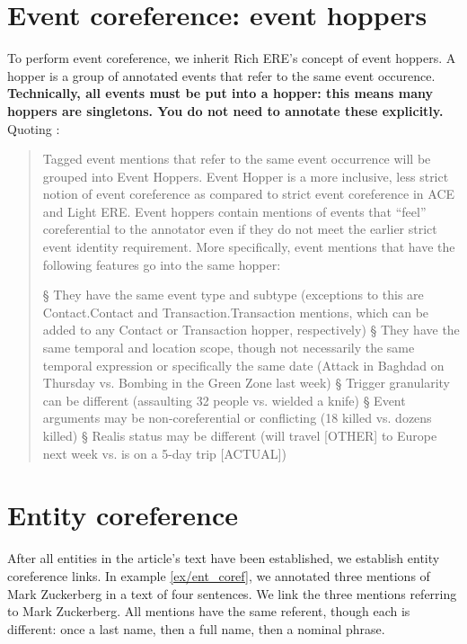 \section{Event coreference: event hoppers}

To perform event coreference, we inherit Rich ERE's concept of event hoppers. \cite{LDC2016.rich_ere} A hopper is a group of annotated events that refer to the same event occurence. \textbf{Technically, all events must be put into a hopper: this means many hoppers are singletons. You do not need to annotate these explicitly.} Quoting \cite{LDC2016.rich_ere}:

\begin{quote}
    Tagged event mentions that refer to the same event occurrence will be grouped into Event Hoppers. Event Hopper is a more inclusive, less strict notion of event coreference as compared to strict event coreference in ACE and Light ERE. Event hoppers contain mentions of events that “feel” coreferential to the annotator even if they do not meet the earlier strict event identity requirement. More specifically, event mentions that have the following features go into the same hopper:

    \begin{el}
        § They have the same event type and subtype (exceptions to this are Contact.Contact and Transaction.Transaction mentions, which can be added to any Contact or Transaction hopper, respectively)
        § They have the same temporal and location scope, though not necessarily the same temporal expression or specifically the same date (Attack in Baghdad on Thursday vs. Bombing in the Green Zone last week)
        § Trigger granularity can be different (assaulting 32 people vs. wielded a knife)
        § Event arguments may be non-coreferential or conflicting (18 killed vs. dozens killed)
        § Realis status may be different (will travel [OTHER] to Europe next week vs. is on a 5-day trip [ACTUAL])
    \end{el}
\end{quote}

\section{Entity coreference}

After all entities in the article's text have been established, we establish entity coreference links. In example \ref{ex/ent_coref}, we annotated three mentions of Mark Zuckerberg in a text of four sentences. We link the three mentions referring to Mark Zuckerberg. All mentions have the same referent, though each is different: once a last name, then a full name, then a nominal phrase. 

